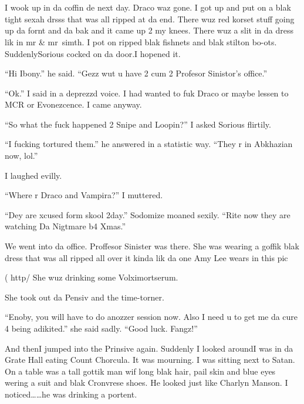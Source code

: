 \section{\chaptername~\thesection}



I wook up in da coffin de next day. Draco waz gone. I got up and put on a blak tight sexah drsss that was all ripped at da end. There wuz red korset stuff going up da fornt and da bak and it came up 2 my knees. There wuz a slit in da dress lik in mr \& mr~simth. I pot on ripped blak fishnets and blak stilton bo-ots. Suddenly\dotfill Sorious cocked on da door.\newline I hopened it.

\enquote{Hi Ibony.} he said. \enquote{Gezz wut u have 2 cum 2 Profesor Sinistor's office.}

\enquote{Ok.} I said in a deprezzd voice. I had wanted to fuk Draco or maybe lessen to MCR or Evonezcence. I came anyway.

\enquote{So what the fuck happened 2 Snipe and Loopin?} I asked Sorious flirtily.

\enquote{I fucking tortured them.} he answered in a statistic way. \enquote{They r in Abkhazian now, lol.}

I laughed evilly.

\enquote{Where r Draco and Vampira?} I muttered.

\enquote{Dey are xcused form skool 2day.} Sodomize moaned sexily. \enquote{Rite now they are watching Da Nigtmare b4 Xmas.}

We went into da office. Proffesor Sinister was there. She was wearing a goffik blak dress that was all ripped all over it kinda lik da one Amy Lee wears in this pic

( http/ She wuz drinking some Volximortserum.

She took out da Pensiv and the time-torner.

\enquote{Enoby, you will have to do anozzer session now. Also I need u to get me da cure 4 being adikited.} she said sadly. \enquote{Good luck. Fangz!}

And then\dotfill I jumped into the Prinsive again.\newline
Suddenly I looked around\dotfill I was in da Grate Hall\newline
eating Count Chorcula. It was mourning. I was sitting next to Satan. On a table was a tall gottik man wif long blak hair, pail skin and blue eyes wering a suit and blak Cronvrese shoes. He looked just like Charlyn Manson. I noticed\ldots\ldots he was drinking a portent.

